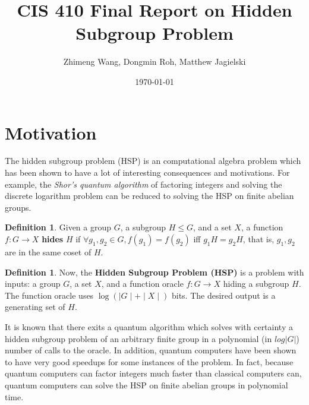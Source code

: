 \documentclass[12pt]{article}
\theoremstyle{plain}
\theoremstyle{definition}
\newtheorem{defn}[thm]{Definition} %
\begin{document}

\title{CIS 410 Final Report on Hidden Subgroup Problem}
\author{Zhimeng Wang, Dongmin Roh, Matthew Jagielski}
\date{\today}



\maketitle


\section{Motivation}

The hidden subgroup problem (HSP) is an computational algebra problem which has been shown to have a lot of interesting consequences and motivations. For example, the \emph{Shor's quantum algorithm} of factoring integers and solving the discrete logarithm problem can be reduced to solving the HSP on finite abelian groups.

\begin{defn}
Given a group $G$, a subgroup $H\le G$, and a set $X$, a function $f:G\rightarrow X$ \textbf{hides} $H$ if $\forall g_1,g_2\in G, f(g_1)=f(g_2)$ iff $g_1H=g_2H$, that is, $g_1,g_2$ are in the same coset of $H$.
\end{defn}

\begin{defn}
Now, the \textbf{Hidden Subgroup Problem (HSP)} is a problem with inputs: a group $G$, a set $X$, and a function oracle $f: G\rightarrow X$ hiding a subgroup $H$. The function oracle uses $\log(\mid G\mid + \mid X\mid)$ bits. The desired output is a generating set of $H$.
\end{defn}

It is known that there exits a quantum algorithm which solves with certainty a hidden subgroup problem of an arbitrary finite group in a polynomial (in $log|G|$) number of calls to the oracle. In addition, quantum computers have been shown to have very good speedups for some instances of the problem. In fact, because quantum computers can factor integers much faster than classical computers can, quantum computers can solve the HSP on finite abelian groups in polynomial time.\\
\end{document}

